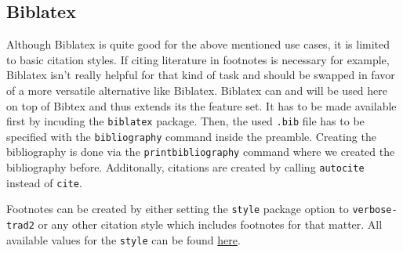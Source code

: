 \documentclass{article}
\begin{document}
\subsection{Biblatex}

Although Biblatex is quite good for the above mentioned use cases, it is limited
to basic citation styles. If citing literature in footnotes is necessary for
example, Biblatex isn't really helpful for that kind of task and should be
swapped in favor of a more versatile alternative like Biblatex. Biblatex can
and will be used here on top of Bibtex and thus extends its the feature set. It
has to be made available first by incuding the \texttt{biblatex} package. Then,
the used \texttt{.bib} file has to be specified with the \texttt{bibliography}
command inside the preamble. Creating the bibliography is done via the
\texttt{printbibliography} command where we created the bibliography before.
Additonally, citations are created by calling \texttt{autocite} instead of
\texttt{cite}.

Footnotes can be created by either setting the \texttt{style} package option to
\texttt{verbose-trad2} or any other citation style which includes footnotes for
that matter. All available values for the \texttt{style} can be found \href{https://ctan.joethei.xyz/macros/latex/contrib/biblatex/doc/biblatex.pdf#subsection.3.3}{here}.

\newpage
\printbibliography
\end{document}
